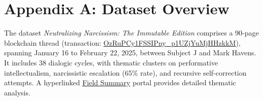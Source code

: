 \documentclass[11pt]{article}
\newcommand{\dataset}[1]{\textit{#1}}
\begin{document}
\section*{Appendix A: Dataset Overview}
The dataset \dataset{Neutralizing Narcissism: The Immutable Edition} \cite{joel2025} comprises a 90-page blockchain thread (transaction: \url{OzRuPCy1FSSIPny_p1UZjYuMjHHzkkM}), spanning January 16 to February 22, 2025, between Subject J and Mark Havens. It includes 38 dialogic cycles, with thematic clusters on performative intellectualism, narcissistic escalation (65\% rate), and recursive self-correction attempts. A hyperlinked \href{https://mirror.xyz/fieldsummary}{Field Summary} portal provides detailed thematic analysis.



\end{document}
